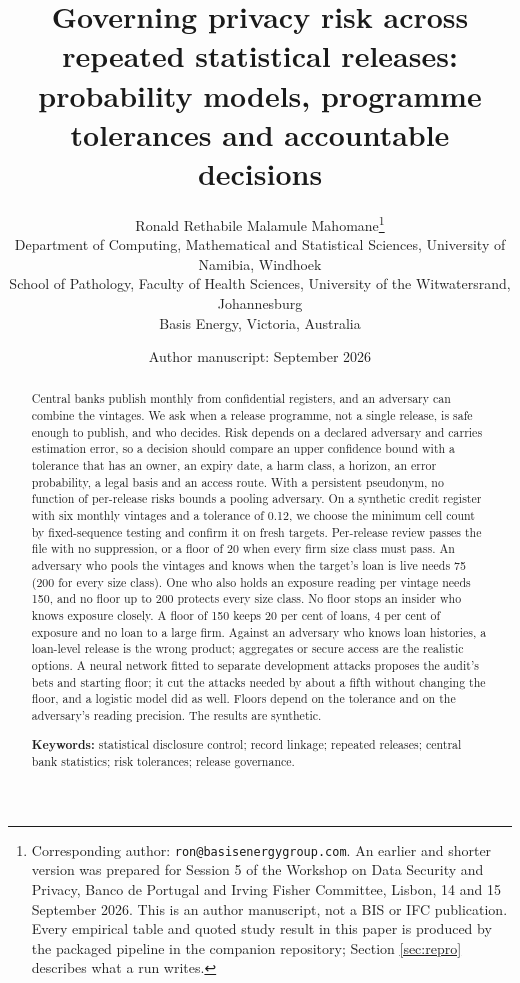 \documentclass[11pt,a4paper]{article}
\title{\bfseries Governing privacy risk across repeated statistical releases:\\
probability models, programme tolerances and accountable decisions}
\author{Ronald Rethabile Malamule Mahomane\thanks{Corresponding author:
\texttt{ron@basisenergygroup.com}. An earlier and shorter version was prepared for Session 5 of the Workshop on Data Security and Privacy, Banco de Portugal and Irving Fisher Committee, Lisbon, 14 and 15 September 2026. This is an author manuscript, not a BIS or IFC publication. Every
empirical table and quoted study result in this paper is produced by the
packaged pipeline in the companion repository; Section \ref{sec:repro} describes
what a run writes.}\\
\small Department of Computing, Mathematical and Statistical Sciences,
University of Namibia, Windhoek\\
\small School of Pathology, Faculty of Health Sciences,
University of the Witwatersrand, Johannesburg\\
\small Basis Energy, Victoria, Australia}
\date{Author manuscript: September 2026}
\theoremstyle{plain}
\theoremstyle{definition}
\theoremstyle{definition}
\theoremstyle{plain}
\begin{document}
\maketitle

\begin{abstract}
\noindent Central banks publish monthly from confidential registers, and an adversary can combine the vintages. We ask when a release programme, not a single release, is safe enough to publish, and who decides. Risk depends on a declared adversary and carries estimation error, so a decision should compare an upper confidence bound with a tolerance that has an owner, an expiry date, a harm class, a horizon, an error probability, a legal basis and an access route. With a persistent pseudonym, no function of per-release risks bounds a pooling adversary. On a synthetic credit register with six monthly vintages and a tolerance of 0.12, we choose the minimum cell count by fixed-sequence testing and confirm it on fresh targets. Per-release review passes the file with no suppression, or a floor of 20 when every firm size class must pass. An adversary who pools the vintages and knows when the target's loan is live needs 75 (200 for every size class). One who also holds an exposure reading per vintage needs 150, and no floor up to 200 protects every size class. No floor stops an insider who knows exposure closely. A floor of 150 keeps 20 per cent of loans, 4 per cent of exposure and no loan to a large firm. Against an adversary who knows loan histories, a loan-level release is the wrong product; aggregates or secure access are the realistic options. A neural network fitted to separate development attacks proposes the audit's bets and starting floor; it cut the attacks needed by about a fifth without changing the floor, and a logistic model did as well. Floors depend on the tolerance and on the adversary's reading precision. The results are synthetic.

\medskip\noindent\textbf{Keywords:} statistical disclosure control; record linkage; repeated releases; central bank statistics; risk tolerances; release governance.
\end{abstract}

\clearpage

\noindent{}
\end{document}
